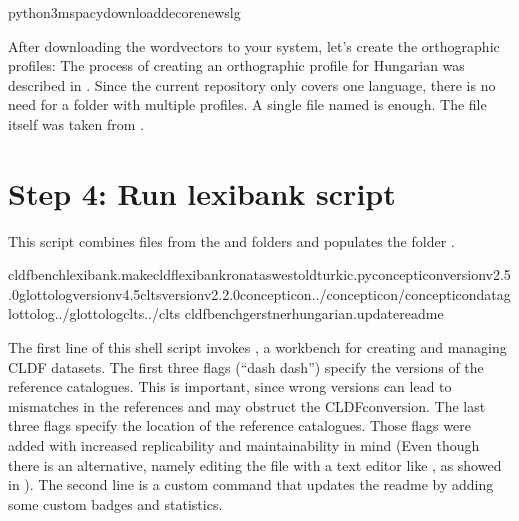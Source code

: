 \documentclass[letterpaper,10pt,english]{sphinxmanual}
\begin{document}
\begin{sphinxVerbatim}[commandchars=\\\{\}]
python3\PYGZhy{}mspacydownloadde\PYGZus{}core\PYGZus{}news\PYGZus{}lg
\end{sphinxVerbatim}

\sphinxAtStartPar
After downloading the word\sphinxhyphen{}vectors to your system, let’s create the
orthographic profiles: The process of creating an orthographic profile for
Hungarian was described in 
. Since the current repository only covers one language, there is no
need for a folder  with multiple profiles. A single file named
 is enough. The file itself was taken from
.


\section{Step 4: Run lexibank script}
\label{\detokenize{mkcldf:step-4-run-lexibank-script}}
\sphinxAtStartPar
This script combines files from the  and  folders
and populates the folder .

\begin{sphinxVerbatim}[commandchars=\\\{\}]
cldfbenchlexibank.makecldflexibank\PYGZus{}ronataswestoldturkic.py\PYGZhy{}\PYGZhy{}concepticon\PYGZhy{}versionv2.5.0\PYGZhy{}\PYGZhy{}glottolog\PYGZhy{}versionv4.5\PYGZhy{}\PYGZhy{}clts\PYGZhy{}versionv2.2.0\PYGZhy{}\PYGZhy{}concepticon../concepticon/concepticon\PYGZhy{}data\PYGZhy{}\PYGZhy{}glottolog../glottolog\PYGZhy{}\PYGZhy{}clts../clts
cldfbenchgerstnerhungarian.update\PYGZus{}readme
\end{sphinxVerbatim}

\sphinxAtStartPar
The first line of this shell script invokes ,
a workbench for creating and managing CLDF datasets. The first three
flags (“dash dash”) specify the versions of the reference catalogues. This is
important,
since wrong versions can lead to mismatches in the references and may
obstruct the CLDF\sphinxhyphen{}conversion.
The last three flags specify the location of the reference
catalogues. Those flags were added with increased replicability and
maintainability in mind (Even though there is an alternative, namely editing
the  file with a text editor like , as showed in
).
The second line is a custom command that updates the readme by adding some
custom badges and statistics.
\end{document}
